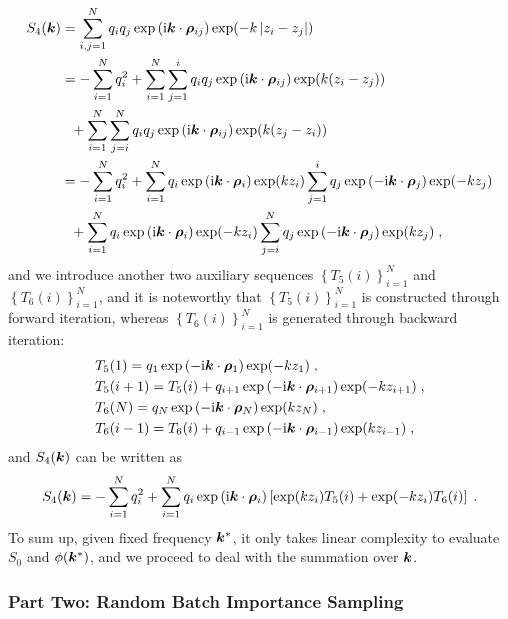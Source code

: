 \begin{align*}
S_4(\bm{k})&=\sum_{i,j=1}^Nq_iq_j  \exp{(\mathrm{i} \boldsymbol{k} \cdot \boldsymbol{\rho}_{ij})}\exp(-k\left\lvert z_i-z_j\right\rvert)\\
&=-\sum_{i=1}^Nq_i^2+\sum_{i=1}^N \sum_{j=1}^iq_iq_j  \exp{(\mathrm{i} \boldsymbol{k} \cdot \boldsymbol{\rho}_{ij})}\exp(k(z_i-z_j))\\
&~~+\sum_{i=1}^N \sum_{j=i}^Nq_iq_j  \exp{(\mathrm{i} \boldsymbol{k} \cdot \boldsymbol{\rho}_{ij})}\exp(k(z_j-z_i))\\
&= -\sum_{i=1}^Nq_i^2+\sum_{i=1}^N q_i\exp{(\mathrm{i} \boldsymbol{k} \cdot \boldsymbol{\rho}_{i})}\exp(kz_i)\sum_{j=1}^iq_j\exp{(-\mathrm{i} \boldsymbol{k} \cdot \boldsymbol{\rho}_{j})}\exp(-kz_j)\\
&~~+\sum_{i=1}^N q_i\exp{(\mathrm{i} \boldsymbol{k} \cdot \boldsymbol{\rho}_{i})}\exp(-kz_i)\sum_{j=i}^Nq_j\exp{(-\mathrm{i} \boldsymbol{k} \cdot \boldsymbol{\rho}_{j})}\exp(kz_j)\;,
\end{align*}
and we introduce another two auxiliary sequences  $\left\{T_5(i)\right\}_{i=1}^N$ and $\left\{T_6(i)\right\}_{i=1}^N$, and it is noteworthy that $\left\{T_5(i)\right\}_{i=1}^N$ is  constructed through forward iteration, whereas  $\left\{T_6(i)\right\}_{i=1}^N$   is generated through backward iteration:
\begin{align*}
    &T_5(1)=q_1\exp{(-\mathrm{i} \boldsymbol{k} \cdot \boldsymbol{\rho}_{1})}\exp(-kz_1)\;,\\
    &T_5(i+1)=T_5(i)+q_{i+1}\exp{(-\mathrm{i} \boldsymbol{k} \cdot \boldsymbol{\rho}_{i+1})}\exp(-kz_{i+1})\;,\\
    &T_6(N)=q_N\exp{(-\mathrm{i} \boldsymbol{k} \cdot \boldsymbol{\rho}_{N})}\exp(kz_N)\;,\\
    &T_6(i-1)=T_6(i)+q_{i-1}\exp{(-\mathrm{i} \boldsymbol{k} \cdot \boldsymbol{\rho}_{i-1})}\exp(kz_{i-1})\;,
\end{align*}
and $S_4(\bm{k})$ can be written as
\[
S_4(\bm{k})= -\sum_{i=1}^Nq_i^2+ \sum_{i=1}^N q_i\exp{(\mathrm{i} \boldsymbol{k} \cdot \boldsymbol{\rho}_{i})}\left[\exp(kz_i)T_5(i)+\exp(-kz_i)T_6(i)\right]\;.
\]
To sum up, given fixed frequency $\bm{k}^\ast$, it only takes  linear complexity to evaluate $S_0$ and $\phi(\bm{k}^\ast)$, and we proceed to deal with the   summation over $\bm{k}$. 
\subsubsection{Part Two: Random Batch Importance Sampling}

